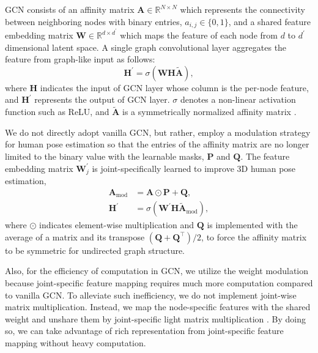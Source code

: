 \documentclass[letterpaper, 10 pt, conference]{ieeeconf}
\begin{document}
GCN consists of an affinity matrix $\mathbf{A}\in\mathbb{R}^{N\times N}$ which represents the connectivity between neighboring nodes with binary entries, $a_{i,j} \in \{0,1\}$, and a shared feature embedding matrix $\mathbf{W}\in \mathbb{R}^{d\times d^{\prime}}$ which maps the feature of each node from $d$ to $d^{\prime}$ dimensional latent space.
A single graph convolutional layer aggregates the feature from graph-like input as follows:
\begin{equation}
    \mathbf{H}^{\prime} = \sigma(\mathbf{W}\mathbf{H}\mathbf{\tilde{A}}),
\end{equation}
where $\mathbf{H}$ indicates the input of GCN layer whose column is the per-node feature, and $\mathbf{H}^{\prime}$ represents the output of GCN layer.
$\sigma$ denotes a non-linear activation function such as ReLU, and $\mathbf{\tilde{A}}$ is a symmetrically normalized affinity matrix \cite{kipf2016semi}.

We do not directly adopt vanilla GCN, but rather, employ a modulation strategy for human pose estimation \cite{zou2021modulated} so that the entries of the affinity matrix are no longer limited to the binary value with the learnable masks, $\mathbf{P}$ and $\mathbf{Q}$.
The feature embedding matrix $\mathbf{W}^{\prime}_{j}$ is joint-specifically learned to improve 3D human pose estimation,
\begin{equation}
\begin{split}
    \mathbf{A}_{\mathrm{mod}} &= \mathbf{A} \odot \mathbf{P} + \mathbf{Q},\\
    \mathbf{H}^{\prime} &= \sigma(\mathbf{W}^{\prime}\mathbf{H}\mathbf{\tilde{A}}_{\mathrm{mod}}),    
\end{split}
\end{equation}
where $\odot$ indicates element-wise multiplication and $\mathbf{Q}$ is implemented with the average of a matrix and its transpose $(\mathbf{Q} + \mathbf{Q^{\top}})/2$, to force the affinity matrix to be symmetric for undirected graph structure.

Also, for the efficiency of computation in GCN, we utilize the weight modulation \cite{zou2021modulated} because joint-specific feature mapping requires much more computation compared to vanilla GCN.
To alleviate such inefficiency, we do not implement joint-wise matrix multiplication.
Instead, we map the node-specific features with the shared weight and unshare them by joint-specific light matrix multiplication \cite{zou2021modulated}.
By doing so, we can take advantage of rich representation from joint-specific feature mapping without heavy computation.
\end{document}
